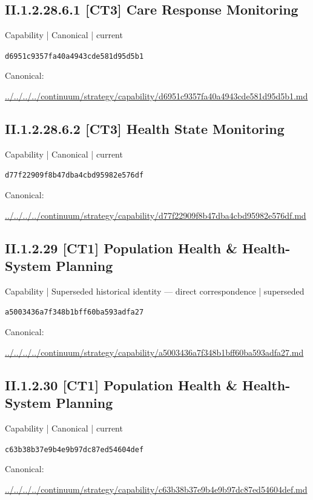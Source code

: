 \documentclass[10pt,a4paper]{article}
\begin{document}
\subsection*{II.1.2.28.6.1 [CT3] Care Response Monitoring}
{\small Capability | Canonical | current}\par
\texttt{d6951c9357fa40a4943cde581d95d5b1}\par
Canonical: \par
{\footnotesize\url{../../../../continuum/strategy/capability/d6951c9357fa40a4943cde581d95d5b1.md}}\par
\subsection*{II.1.2.28.6.2 [CT3] Health State Monitoring}
{\small Capability | Canonical | current}\par
\texttt{d77f22909f8b47dba4cbd95982e576df}\par
Canonical: \par
{\footnotesize\url{../../../../continuum/strategy/capability/d77f22909f8b47dba4cbd95982e576df.md}}\par
\subsection*{II.1.2.29 [CT1] Population Health \& Health-System Planning}
{\small Capability | Superseded historical identity — direct correspondence | superseded}\par
\texttt{a5003436a7f348b1bff60ba593adfa27}\par
Canonical: \par
{\footnotesize\url{../../../../continuum/strategy/capability/a5003436a7f348b1bff60ba593adfa27.md}}\par
\subsection*{II.1.2.30 [CT1] Population Health \& Health-System Planning}
{\small Capability | Canonical | current}\par
\texttt{c63b38b37e9b4e9b97dc87ed54604def}\par
Canonical: \par
{\footnotesize\url{../../../../continuum/strategy/capability/c63b38b37e9b4e9b97dc87ed54604def.md}}\par
\end{document}
